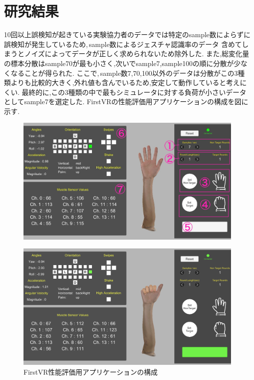 \documentclass{ltjsarticle}
\begin{document}
\section{研究結果}
		10回以上誤検知が起きている実験協力者のデータでは特定のsample数によらずに誤検知が発生しているため,\,sample数によるジェスチャ認識率のデータ
		含めてしまうとノイズによってデータが正しく求められないため除外した.
		また,総変化量の標本分散はsample70が最も小さく,次いでsample7,sample100の順に分散が少なくなることが得られた.
		ここで,\,sample数7,70,100以外のデータは分散がこの3種類よりも比較的大きく,外れ値も含んでいるため,安定して動作していると考えにくい.
		最終的に,この3種類の中で最もシミュレータに対する負荷が小さいデータとしてsample7を選定した.
		FirstVRの性能評価用アプリケーションの構成を図に示す.
		\begin{figure}[H]
		\centering
		\begin{minipage}{0.9\columnwidth}
		\centering
		\includegraphics[width = \columnwidth]{../figs/IMG_0345.JPG}
		\label{fig:FVRnocalibration}
		\end{minipage}
		\hspace{0.04\columnwidth}
		\begin{minipage}{0.9\columnwidth}
		\centering
		\includegraphics[width = \columnwidth]{../figs/IMG_1867.PNG}
		\end{minipage}
		\caption{FirstVR性能評価用アプリケーションの構成}
		\label{fig:FirstVRapplication}
		\end{figure}
		\vspace{-15pt}
\end{document}
